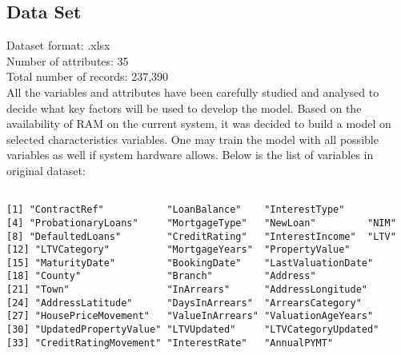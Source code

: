 \subsection{Data Set}
Dataset format: .xlsx\\
Number of attributes: 35\\
Total number of records: 237,390\\
All the variables and attributes have been carefully studied and analysed to decide what key factors will be used to develop the model. Based on the availability of RAM on the current system, it was decided to build a model on selected characteristics variables. One may train the model with all possible variables as well if system hardware allows. Below is the list of variables in original dataset:

\begin{verbatim}

[1] "ContractRef"           "LoanBalance"    "InterestType"    
[4] "ProbationaryLoans"     "MortgageType"   "NewLoan"         "NIM"  
[8] "DefaultedLoans"        "CreditRating"   "InterestIncome"  "LTV"               
[12] "LTVCategory"          "MortgageYears"  "PropertyValue"             
[15] "MaturityDate"         "BookingDate"    "LastValuationDate"      
[18] "County"               "Branch"         "Address"   
[21] "Town"                 "InArrears"      "AddressLongitude" 
[24] "AddressLatitude"      "DaysInArrears"  "ArrearsCategory"
[27] "HousePriceMovement"   "ValueInArrears" "ValuationAgeYears"
[30] "UpdatedPropertyValue" "LTVUpdated"     "LTVCategoryUpdated"
[33] "CreditRatingMovement" "InterestRate"   "AnnualPYMT"

\end{verbatim}

